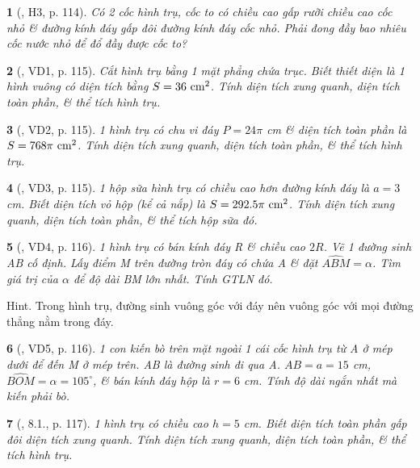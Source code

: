 \documentclass{article}
\newtheorem{baitoan}{}
\begin{document}
\begin{baitoan}[\cite{Binh_boi_duong_Toan_9_tap_2}, H3, p. 114]
	Có 2 cốc hình trụ, cốc to có chiều cao gấp rưỡi chiều cao cốc nhỏ \& đường kính đáy gấp đôi đường kính đáy cốc nhỏ. Phải đong đầy bao nhiêu cốc nước nhỏ để đổ đầy được cốc to?
\end{baitoan}

\begin{baitoan}[\cite{Binh_boi_duong_Toan_9_tap_2}, VD1, p. 115]
	Cắt hình trụ bằng 1 mặt phẳng chứa trục. Biết thiết diện là 1 hình vuông có diện tích bằng $S = 36\ {\rm cm}^2$. Tính diện tích xung quanh, diện tích toàn phần, \& thể tích hình trụ.
\end{baitoan}

\begin{baitoan}[\cite{Binh_boi_duong_Toan_9_tap_2}, VD2, p. 115]
	1 hình trụ có chu vi đáy $P = 24\pi$ {\rm cm} \& diện tích toàn phần là $S = 768\pi\ {\rm cm}^2$. Tính diện tích xung quanh, diện tích toàn phần, \& thể tích hình trụ.
\end{baitoan}

\begin{baitoan}[\cite{Binh_boi_duong_Toan_9_tap_2}, VD3, p. 115]
	1 hộp sữa hình trụ có chiều cao hơn đường kính đáy là $a = 3$ {\rm cm}. Biết diện tích vỏ hộp (kể cả nắp) là $S = 292.5\pi\ {\rm cm}^2$. Tính diện tích xung quanh, diện tích toàn phần, \& thể tích hộp sữa đó.
\end{baitoan}

\begin{baitoan}[\cite{Binh_boi_duong_Toan_9_tap_2}, VD4, p. 116]
	1 hình trụ có bán kính đáy R \& chiều cao $2R$. Vẽ 1 đường sinh AB cố định. Lấy điểm M trên đường tròn đáy có chứa A \& đặt $\widehat{ABM} = \alpha$. Tìm giá trị của $\alpha$ để độ dài BM lớn nhất. Tính {\rm GTLN} đó.
\end{baitoan}
{\sf Hint.} Trong hình trụ, đường sinh vuông góc với đáy nên vuông góc với mọi đường thẳng nằm trong đáy.

\begin{baitoan}[\cite{Binh_boi_duong_Toan_9_tap_2}, VD5, p. 116]
	1 con kiến bò trên mặt ngoài 1 cái cốc hình trụ từ A ở mép dưới để đến M ở mép trên. AB là đường sinh đi qua A. $AB = a = 15$ {\rm cm}, $\widehat{BOM} = \alpha = 105^\circ$, \& bán kính đáy hộp là $r = 6$ {\rm cm}. Tính độ dài ngắn nhất mà kiến phải bò.
\end{baitoan}

\begin{baitoan}[\cite{Binh_boi_duong_Toan_9_tap_2}, 8.1., p. 117]
	1 hình trụ có chiều cao $h = 5$ {\rm cm}. Biết diện tích toàn phần gấp đôi diện tích xung quanh. Tính diện tích xung quanh, diện tích toàn phần, \& thể tích hình trụ.
\end{baitoan}
\end{document}
